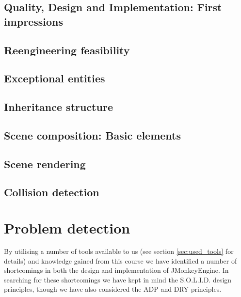 \documentclass[a4paper, 10pt]{article}
\begin{document}
\subsection{Quality, Design and Implementation: First impressions}
\label{sec:first_impressions}


\subsection{Reengineering feasibility}
\label{sec:reengineering_feasibility}


\subsection{Exceptional entities}
\label{sec:exceptional_entities}


\subsection{Inheritance structure}
\label{sec:inheritance_structure}


\subsection{Scene composition: Basic elements}
\label{sec:scene_composition}


\subsection{Scene rendering}
\label{sec:scene_rendering}


\subsection{Collision detection}
\label{sec:collision_detection}


\newpage
\section{Problem detection}
\label{sec:problem_detection}

By utilising a number of tools available to us (see section
\ref{sec:used_tools} for details) and knowledge gained from this
course we have identified a number of shortcomings in both the design
and implementation of JMonkeyEngine. In searching for these
shortcomings we have kept in mind the  S.O.L.I.D. design principles,
though we have also considered the ADP and DRY principles.
\end{document}
